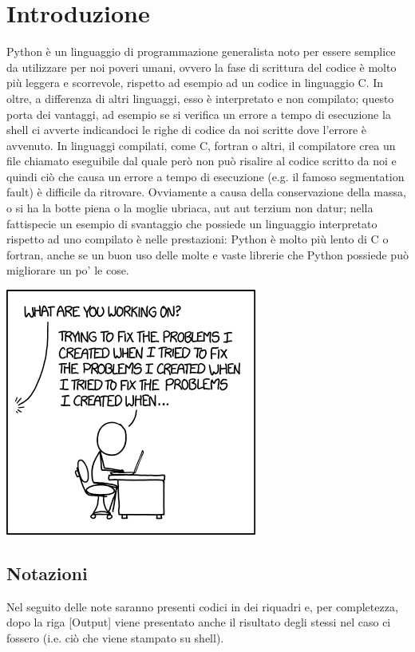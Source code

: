 \documentclass[10pt,a4paper]{article}
\begin{document}
\newpage

\section{Introduzione}
Python è un linguaggio di programmazione generalista noto per essere semplice da utilizzare per noi poveri umani, ovvero la fase di scrittura del codice è molto più leggera e scorrevole, rispetto ad esempio ad un codice in linguaggio C. In oltre, a differenza di altri linguaggi, esso è interpretato e non compilato; questo porta dei vantaggi, ad esempio se si verifica un errore a tempo di esecuzione la shell ci avverte indicandoci le righe di codice da noi scritte dove l'errore è avvenuto. In linguaggi compilati, come C, fortran o altri, il compilatore crea un file chiamato eseguibile dal quale però non può risalire al codice scritto da noi e quindi ciò che causa un errore a tempo di esecuzione (e.g. il famoso segmentation fault) è difficile da ritrovare. Ovviamente a causa della conservazione della massa, o si ha la botte piena o la moglie ubriaca, aut aut terzium non datur; nella fattispecie un esempio di svantaggio che possiede un linguaggio interpretato rispetto ad uno compilato è nelle prestazioni: Python è molto più lento di C o fortran, anche se un buon uso delle molte e vaste librerie che Python possiede può migliorare un po' le cose.
\[
\]
\begin{center}
\includegraphics[scale=0.7]{img/fixing_problems.png}
\end{center}

\subsection{Notazioni}
Nel seguito delle note saranno presenti codici in dei riquadri e, per completezza, dopo la riga [Output] viene presentato anche il risultato degli stessi nel caso ci fossero (i.e. ciò che viene stampato su shell).
\end{document}
